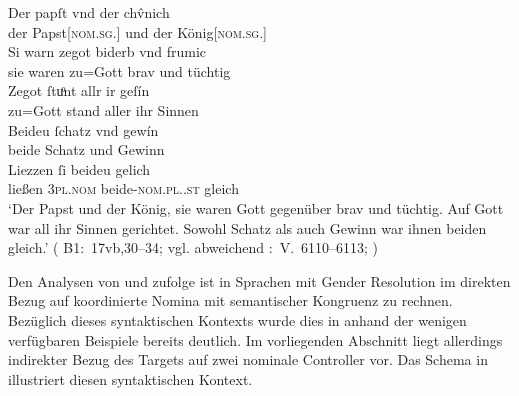 \begin{exe}
\ex\label{ex:papstkoenig5} %
	\gll Der papſt vnd der chv̂nich \\
		der Papst[\textsc{nom.sg.\MascM}] und der König[\textsc{nom.sg.\MascM}]
		\\
\sn \gll Si warn zegot biderb vnd frumic \\
		sie waren {zu=Gott} brav und tüchtig \\
\sn \gll Zegot ſtuͦnt allr ir geſín \\
		{zu=Gott} stand aller ihr Sinnen \\
\sn \gll Beideu ſchatz vnd gewín \\
		beide Schatz und Gewinn \\
\sn \gll Liezzen ſi beideu gelich \\
		ließen \textsc{3pl\subM.nom} beide-\textsc{nom.pl.\NeutM.st} gleich \\
	\trans `Der Papst und der König, sie waren Gott gegenüber brav und
		tüchtig. Auf Gott war all ihr Sinnen gerichtet. Sowohl Schatz als auch
		Gewinn war ihnen beiden gleich.'
		(%
			B1:~17vb,30--34; vgl. abweichend
			\KC:~V.~6110--6113;
			\cite[202]{schroeder1895}%
		)
\end{exe}

Den Analysen von \citet{wechsler2009} und \citet{wechslerzlatic2003} zufolge
ist in Sprachen mit Gender Resolution im direkten Bezug auf koordinierte Nomina
mit semantischer Kongruenz zu rechnen. Bezüglich dieses syntaktischen Kontexts
wurde dies in  anhand der wenigen verfügbaren Beispiele
bereits deutlich. Im vorliegenden Abschnitt liegt allerdings indirekter Bezug
des Targets  auf zwei nominale Controller vor. Das Schema in
 illustriert diesen syntaktischen Kontext.

